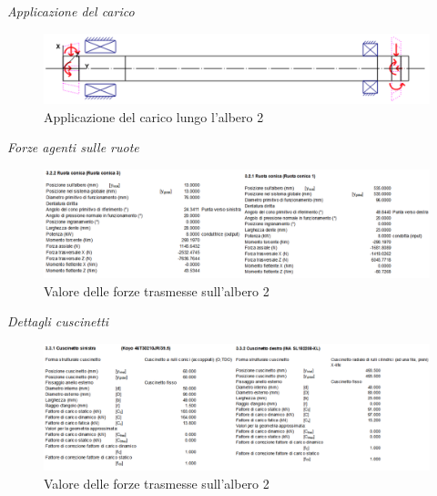 \emph{Applicazione del carico}
\begin{figure}[h]
    \centering
    \includegraphics[scale=0.5]{Immagini/CaricoAlbero2.png}
    \caption{Applicazione del carico lungo l'albero 2}
    \label{fig:CaricoAlbero2}
\end{figure}
\newpage
\emph{Forze agenti sulle ruote}
\begin{figure}[h]
    \centering
    \includegraphics[scale=0.5]{Immagini/ForzeRuoteAlbero2.png}
    \caption{Valore delle forze trasmesse sull'albero 2}
    \label{fig:ForzeRuoteAlbero2}
\end{figure}

\emph{Dettagli cuscinetti}
\begin{figure}[h]
    \centering
    \includegraphics[scale=0.5]{Immagini/ForzeCuscinettiAlbero2.png}
    \caption{Valore delle forze trasmesse sull'albero 2}
    \label{fig:ForzeCusinettiAlbero2}
\end{figure}

